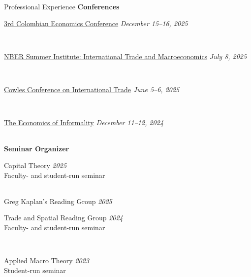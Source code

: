 \documentclass{resume} %
\begin{document}
	\pagebreak
		\begin{rSection}{Professional Experience}
			\textbf{Conferences}\\
			\parbox{\linewidth}{\href{https://economia.uniandes.edu.co/es/actualidad/eventos/3rd-colombian-economics-conference}{3rd Colombian Economics Conference} \hfill {\em December 15--16, 2025}}\\[0.25em]
			\parbox{\linewidth}{\href{https://www.nber.org/conferences/si-2025-international-trade-and-macroeconomics}{NBER Summer Institute: International Trade and Macroeconomics} \hfill {\em July 8, 2025}}\\[0.25em]
			\parbox{\linewidth}{\href{https://cowles.yale.edu/conferences/international-trade/2025}{Cowles Conference on International Trade} \hfill {\em June 5--6, 2025}}\\[0.25em]
			\parbox{\linewidth}{\href{https://evento.uniandes.edu.co/en/the-economics-of-informality-2024}{The Economics of Informality} \hfill {\em December 11--12, 2024}}\\[0.75em]

			\textbf{Seminar Organizer}\\
			\parbox{\linewidth}{Capital Theory \hfill {\em 2025}\\[-0.25em]
			{\small Faculty- and student-run seminar}}\\[0.35em]
			Greg Kaplan's Reading Group \hfill {\em 2025}\\[0.35em]
			\parbox{\linewidth}{Trade and Spatial Reading Group \hfill {\em 2024}\\[-0.25em]
			{\small Faculty- and student-run seminar}}\\[0.35em]
			\parbox{\linewidth}{Applied Macro Theory \hfill {\em 2023}\\[-0.25em]
			{\small Student-run seminar}}

	\end{rSection}
\end{document}
